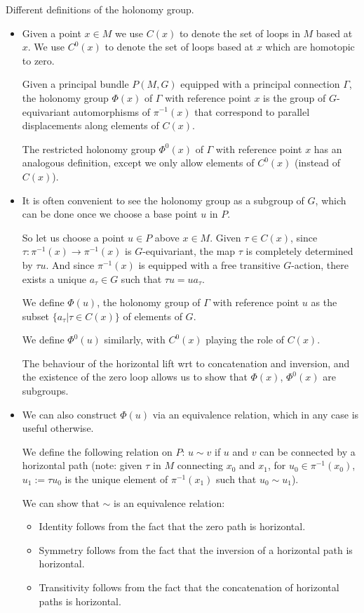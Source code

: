 \documentclass{report}
\theoremstyle{definition}
\begin{document}
Different definitions of the holonomy group.
\begin{itemize}
    \item Given a point $x\in M$ we use $C(x)$ to denote the set of loops in $M$ based at $x$. We use $C^0(x)$ to denote the set of loops based at $x$ which are homotopic to zero.

    Given a principal bundle $P(M,G)$ equipped with a principal connection $\Gamma$, the holonomy group $\Phi(x)$ of $\Gamma$ with reference point $x$ is the group of $G$-equivariant automorphisms of $\pi^{-1}(x)$ that correspond to parallel displacements along elements of $C(x)$.

    The restricted holonomy group $\Phi^0(x)$ of $\Gamma$ with reference point $x$ has an analogous definition, except we only allow elements of $C^0(x)$ (instead of $C(x)$).
    \item It is often convenient to see the holonomy group as a subgroup of $G$, which can be done once we choose a base point $u$ in $P$.

    So let us choose a point $u\in P$ above $x\in M$. Given $\tau\in C(x)$, since $\tau:\pi^{-1}(x)\to\pi^{-1}(x)$ is $G$-equivariant, the map $\tau$ is completely determined by $\tau u$. And since $\pi^{-1}(x)$ is equipped with a free transitive $G$-action, there exists a unique $a_\tau\in G$ such that $\tau u=u a_{\tau}$.

    We define $\Phi(u)$, the holonomy group of $\Gamma$ with reference point $u$ as the subset $\{a_\tau|\tau\in C(x)\}$ of elements of $G$.

    We define $\Phi^0(u)$ similarly, with $C^0(x)$ playing the role of $C(x)$.

    The behaviour of the horizontal lift wrt to concatenation and inversion, and the existence of the zero loop allows us to show that $\Phi(x)$, $\Phi^0(x)$ are subgroups.
    \item We can also construct $\Phi(u)$ via an equivalence relation, which in any case is useful otherwise.

    We define the following relation on $P$: $u\sim v$ if $u$ and $v$ can be connected by a horizontal path (note: given $\tau$ in $M$ connecting $x_0$ and $x_1$, for $u_0\in\pi^{-1}(x_0)$, $u_1:=\tau u_0$ is the unique element of $\pi^{-1}(x_1)$ such that $u_0\sim u_1$).

    We can show that $\sim$ is an equivalence relation:
    \begin{itemize}
        \item Identity follows from the fact that the zero path is horizontal.
        \item Symmetry follows from the fact that the inversion of a horizontal path is horizontal.
        \item Transitivity follows from the fact that the concatenation of horizontal paths is horizontal.
    \end{itemize}


\end{itemize}
\end{document}
